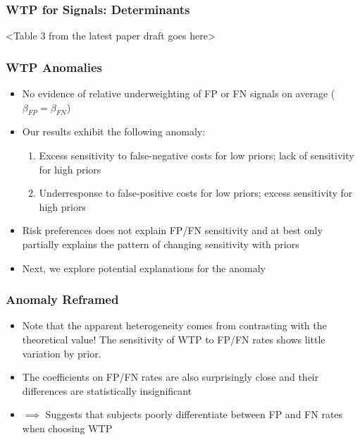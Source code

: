 \documentclass[11pt,hyperref={bookmarks=false}]{beamer}
\begin{document}
\begin{frame}
\frametitle{WTP for Signals: Determinants}
<Table 3 from the latest paper draft goes here>

%
\end{frame}



\begin{frame}
\frametitle{WTP Anomalies}
\begin{itemize}
\item No evidence of relative underweighting of FP or FN signals on average ($\beta_{FP}=\beta_{FN}$)
\item Our results exhibit the following anomaly:
\begin{enumerate}
\item Excess sensitivity to false-negative costs for low priors; lack of sensitivity for high priors
\item Underresponse to false-positive costs for low priors; excess sensitivity for high priors
\end{enumerate}
\item Risk preferences does not explain FP/FN sensitivity and at best only partially explains the pattern of changing sensitivity with priors
\item Next, we explore potential explanations for the anomaly
\end{itemize}
\end{frame}




\begin{frame}
\frametitle{Anomaly Reframed}
\begin{itemize}
\item Note that the apparent heterogeneity comes from contrasting with the theoretical value! The sensitivity of WTP to FP/FN rates shows little variation by prior.
\item The coefficients on FP/FN rates are also surprisingly close and their differences are statistically insignificant
\item $\implies$ Suggests that subjects poorly differentiate between FP and FN rates when choosing WTP
\end{itemize}
\scriptsize
\begin{center}

\end{center}
\end{frame}
\end{document}
